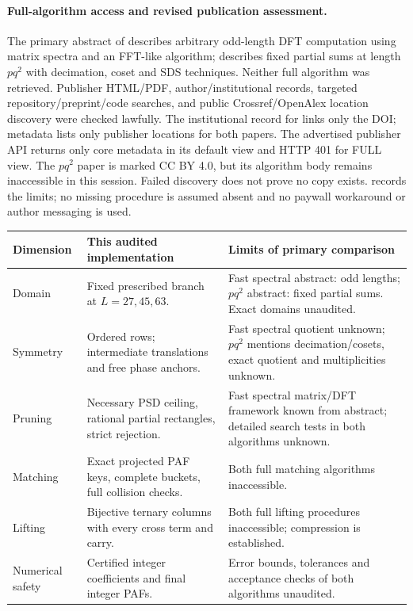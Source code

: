 \documentclass[11pt]{article}
\begin{document}
\paragraph{Full-algorithm access and revised publication assessment.}
The primary abstract of \cite{perera} describes arbitrary odd-length DFT
computation using matrix spectra and an FFT-like algorithm; \cite{pq2}
describes fixed partial sums at length $pq^2$ with decimation, coset and SDS
techniques. Neither full algorithm was retrieved. Publisher HTML/PDF,
author/institutional records, targeted repository/preprint/code searches,
and public Crossref/OpenAlex location discovery were checked lawfully.
The institutional record for \cite{perera} links only the DOI; metadata
lists only publisher locations for both papers. The advertised publisher
API returns only core metadata in its default view and HTTP 401 for FULL
view. The $pq^2$ paper is marked CC BY 4.0, but its algorithm body remains
inaccessible in this session. Failed discovery does not prove no copy exists.
 records the limits; no missing procedure is
assumed absent and no paywall workaround or author messaging is used.

\begin{longtable}{p{.18\linewidth}p{.33\linewidth}p{.38\linewidth}}
\toprule
Dimension & This audited implementation & Limits of primary comparison\\\midrule
\endhead
Domain & Fixed prescribed branch at $L=27,45,63$. & Fast spectral abstract:
odd lengths; $pq^2$ abstract: fixed partial sums. Exact domains unaudited.\\
Symmetry & Ordered rows; intermediate translations and free phase anchors. &
Fast spectral quotient unknown; $pq^2$ mentions decimation/cosets, exact
quotient and multiplicities unknown.\\
Pruning & Necessary PSD ceiling, rational partial rectangles, strict rejection. &
Fast spectral matrix/DFT framework known from abstract; detailed search
tests in both algorithms unknown.\\
Matching & Exact projected PAF keys, complete buckets, full collision checks. &
Both full matching algorithms inaccessible.\\
Lifting & Bijective ternary columns with every cross term and carry. &
Both full lifting procedures inaccessible; compression is established.\\
Numerical safety & Certified integer coefficients and final integer PAFs. &
Error bounds, tolerances and acceptance checks of both algorithms unaudited.\\
\bottomrule
\end{longtable}
\end{document}
